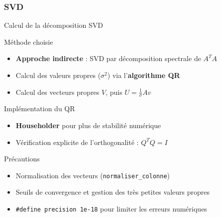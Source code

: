 \subsubsection{SVD}
\begin{frame}{Calcul de la décomposition SVD}
\pause
\begin{block}{Méthode choisie}
\begin{itemize}
  \item \textbf{Approche indirecte} : SVD par décomposition spectrale de \( A^T A \)
  \pause
  \item Calcul des valeurs propres (\( \sigma^2 \)) via l'\textbf{algorithme QR}
  \pause
  \item Calcul des vecteurs propres \( V \), puis \( U = \frac{1}{\sigma} A v \)
\end{itemize}
\end{block}

\pause
\begin{block}{Implémentation du QR}
\begin{itemize}
  \item \textbf{Householder} pour plus de stabilité numérique
  \pause
  \item Vérification explicite de l’orthogonalité : \( Q^T Q = I \)
\end{itemize}
\end{block}

\pause
\begin{block}{Précautions}
\begin{itemize}
  \item Normalisation des vecteurs (\texttt{normaliser\_colonne})
  \pause
  \item Seuils de convergence et gestion des très petites valeurs propres
  \pause
  \item \texttt{\#define precision 1e-18} pour limiter les erreurs numériques
\end{itemize}
\end{block}

\end{frame}




